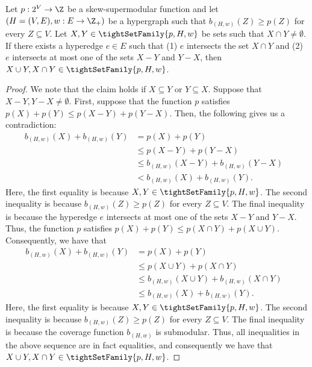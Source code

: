 \begin{lemma}\label{lem:weak-to-strong:uncrossing:uncrossing-lemma}
Let $p:2^V\rightarrow\Z$ be a skew-supermodular function and let $\left(H = (V, E), w:E \rightarrow\Z_+\right)$ be a hypergraph such that $b_{(H,w)}(Z) \geq p(Z)$ for every $Z \subseteq V$. Let $X, Y \in \tightSetFamily{p, H, w}$ be sets such that $X\cap Y \not = \emptyset$.
If there exists a hyperedge $e \in E$ such that (1) $e$ intersects the set $X\cap Y$ and 
(2) $e$ intersects at most one of the sets $X - Y$ and $Y - X$, then $X\cup Y, X \cap Y \in \tightSetFamily{p, H, w}$.
\end{lemma}
\begin{proof}
We note that the claim holds if $X\subseteq Y$ or $Y \subseteq X$. Suppose that $X - Y, Y - X \not= \emptyset$. First, suppose that the function $p$ satisfies $p(X) + p(Y) \leq p(X - Y) + p(Y - X)$. Then, the following gives us a contradiction:
\begin{align*}
    b_{(H,w)}(X) + b_{(H,w)}(Y) 
    &= p(X) + p(Y) &\\
    & \leq p(X - Y) + p(Y - X) & \\
    & \leq b_{(H,w)}(X - Y) + b_{(H,w)}(Y - X) & \\
    & < b_{(H,w)}(X) + b_{(H,w)}(Y).
\end{align*}
Here, the first equality is because $X, Y \in \tightSetFamily{p, H, w}$. The second inequality is because $b_{(H,w)}(Z) \geq p(Z)$ for every $Z\subseteq V$. The final inequality is because the hyperedge $e$ intersects at most one of the sets $X - Y$ and $Y - X$.
Thus, the function $p$ satisfies $p(X) + p(Y) \leq p(X\cap Y) + p(X \cup Y)$. Consequently, we have that
\begin{align*}
    b_{(H,w)}(X) + b_{(H,w)}(Y) 
    &= p(X) + p(Y) &\\
    & \leq p(X \cup Y) + p(X \cap Y) &\\
    & \leq b_{(H,w)}(X\cup Y) + b_{(H,w)}(X\cap Y) &\\
    & \leq b_{(H,w)}(X) + b_{(H,w)}(Y).&
\end{align*}
Here, the first equality is because $X, Y \in \tightSetFamily{p, H, w}$. The second inequality is because $b_{(H,w)}(Z) \geq p(Z)$ for every $Z\subseteq V$. The final inequality is because the coverage function $b_{(H, w)}$ is submodular. Thus, all inequalities in the above sequence are in fact equalities, and consequently we have that $X\cup Y, X\cap Y \in \tightSetFamily{p, H, w}$.
\end{proof}

